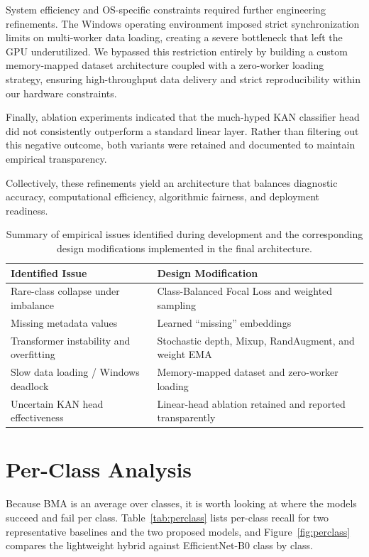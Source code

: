 System efficiency and OS-specific constraints required further engineering refinements. The Windows operating environment imposed strict synchronization limits on multi-worker data loading, creating a severe bottleneck that left the GPU underutilized. We bypassed this restriction entirely by building a custom memory-mapped dataset architecture coupled with a zero-worker loading strategy, ensuring high-throughput data delivery and strict reproducibility within our hardware constraints. 

Finally, ablation experiments indicated that the much-hyped KAN classifier head did not consistently outperform a standard linear layer. Rather than filtering out this negative outcome, both variants were retained and documented to maintain empirical transparency. 

Collectively, these refinements yield an architecture that balances diagnostic accuracy, computational efficiency, algorithmic fairness, and deployment readiness.

\begin{table}[H]
\centering
\caption{Summary of empirical issues identified during development and the corresponding design modifications implemented in the final architecture.}
\label{tab:design_refinements}
\begin{tabularx}{\textwidth}{>{\raggedright\arraybackslash}p{}>{\raggedright\arraybackslash}X}
\toprule
\textbf{Identified Issue} & \textbf{Design Modification} \\
\midrule
Rare-class collapse under imbalance & Class-Balanced Focal Loss and weighted sampling \\
Missing metadata values & Learned ``missing'' embeddings \\
Transformer instability and overfitting & Stochastic depth, Mixup, RandAugment, and weight EMA \\
Slow data loading / Windows deadlock & Memory-mapped dataset and zero-worker loading \\
Uncertain KAN head effectiveness & Linear-head ablation retained and reported transparently \\
\bottomrule
\end{tabularx}
\end{table}


\section{Per-Class Analysis}

Because BMA is an average over classes, it is worth looking at where the models
succeed and fail per class. Table~\ref{tab:perclass} lists per-class recall for
two representative baselines and the two proposed models, and
Figure~\ref{fig:perclass} compares the lightweight hybrid against EfficientNet-B0
class by class.

